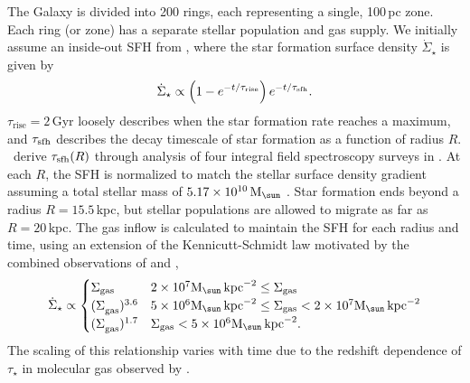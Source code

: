 \documentclass[fleqn,
referee, %
usenatbib]{mnras}
\newcommand{\JJ}{\citetalias{james+21}}
\newcommand{\Mo}{ {\rm M}_{\sun}}
\begin{document}
The Galaxy is divided into 200 rings, each representing a single, 100\,pc zone. Each ring (or zone) has a separate stellar population and gas supply. We initially assume an inside-out SFH from \JJ, where the star formation surface density $\dot{\Sigma}_\star$ is given by 
\begin{equation}\label{eq:inside_out}
    \dot{\Sigma}_\star \propto \left(1-e^{-t/\tau_{\rm rise}}\right) e^{-t/\tau_{\rm sfh}}.
\end{equation}
$\tau_\text{rise}=2$\,Gyr loosely describes when the star formation rate reaches a maximum, and $\tau_{\rm sfh}$ describes the decay timescale of star formation as a function of radius $R$. \JJ\ derive $\tau_{\rm sfh}(R)$ through analysis of four integral field spectroscopy surveys in \cite{sanches20}. At each $R$, the SFH is normalized to match the stellar surface density gradient \citep{BHG16} assuming a total stellar mass of $5.17\times10^{10}\,\Mo$ \citep{LM15}. Star formation ends beyond a radius $R=15.5\,$kpc, but stellar populations are allowed to migrate as far as $R=20\,$kpc.  
The gas inflow is calculated to maintain the SFH for each radius and time, using an extension of the Kennicutt-Schmidt law \citep{kennicutt98} motivated by the combined observations of \citet{bigiel+10} and \citet{leroy+13}, 
\begin{equation}
\dot{\Sigma}_{\star} \propto 
\begin{cases}
    {\Sigma}_{\rm gas} & 2\times 10^7 \Mo\,{\rm kpc}^{-2} \leq \Sigma_{\rm gas} \\ 
    {(\Sigma}_{\rm gas})^{3.6} & 5\times 10^6 \Mo\,{\rm kpc}^{-2}\leq \Sigma_{\rm gas} < 2\times10^7 \Mo\,{\rm kpc}^{-2}\\ 
    {(\Sigma}_{\rm gas})^{1.7} & \Sigma_{\rm gas} < 5\times10^6 \Mo\,{\rm kpc}^{-2}.
\end{cases}
\end{equation} 
The scaling of this relationship varies with time due to the redshift dependence of $\tau_\star$ in molecular gas observed by \citet{tacconi18}.
\end{document}
